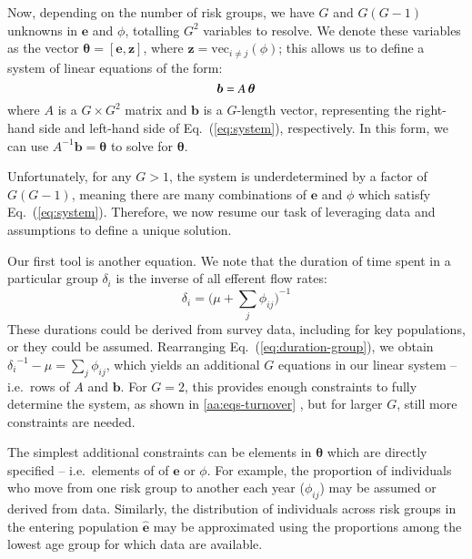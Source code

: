 Now, depending on the number of risk groups, we have
$G$ and $G(G-1)$ unknowns in $\bm{e}$ and $\phi$, totalling $G^2$ variables to resolve.
We denote these variables as the vector $\bm{\theta} = \left[\bm{e}, \bm{z}\right]$,
where $\bm{z} = \mathrm{vec}_{i \ne j}(\phi)$;
this allows us to define
a system of linear equations of the form:
\begin{equation}\label{eq:system-matrix}
\bm{b} = A \thinspace \bm{\theta}
\end{equation}
where $A$ is a $G \times G^2 $ matrix
and $\bm{b}$ is a $G$-length vector,
representing the right-hand side and left-hand side of Eq.~(\ref{eq:system}), respectively.
In this form, we can use $A^{-1}\bm{b} = \bm{\theta}$ to solve for $\bm{\theta}$.
\par %
Unfortunately, for any $G > 1$, the system is underdetermined by a factor of $G(G-1)$,
meaning there are many combinations of $\bm{e}$ and $\phi$ which satisfy Eq.~(\ref{eq:system}).
Therefore, we now resume our task of leveraging data and assumptions
to define a unique solution.
\par
Our first tool is another equation.
We note that the duration of time spent in a particular group $\delta_i$
is the inverse of all efferent flow rates:
\begin{equation}\label{eq:duration-group}
\delta_i = {\bigg(\mu + \sum_{j}{\phi_{ij}}\bigg)}^{-1}
\end{equation}
These durations could be derived from survey data, including for key populations,
or they could be assumed.
Rearranging Eq.~(\ref{eq:duration-group}), we obtain
${\delta_i}^{-1} - \mu = \sum_{j}{\phi_{ij}}$,
which yields an additional $G$ equations in our linear system -- i.e.\ rows of $A$ and $\bm{b}$.
For $G = 2$, this provides enough constraints to fully determine the system, %
as shown in \ref{aa:eqs-turnover} ,
but for larger $G$, still more constraints are needed.
\par
The simplest additional constraints can be elements in $\bm{\theta}$ which are directly specified
-- i.e.\ elements of of $\bm{e}$ or $\phi$.
For example, the proportion of individuals who
move from one risk group to another each year ($\phi_{ij}$)
may be assumed or derived from data.
Similarly, the distribution of individuals
across risk groups in the entering population $\bm{\hat{e}}$
may be approximated using the proportions among
the lowest age group for which data are available.
